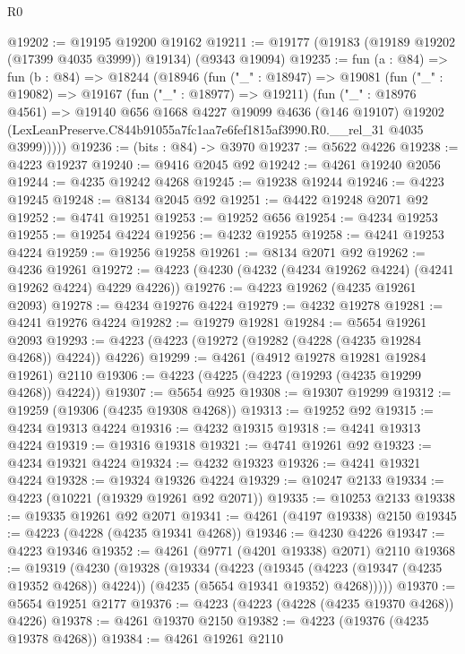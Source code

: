 \begin{lexlean}{R0}
\begin{coremodule}
@19202 := @19195 @19200 @19162
@19211 := @19177 (@19183 (@19189 @19202 (@17399 @4035 @3999)) @19134) (@9343 @19094)
@19235 := fun (a : @84) =>
  fun (b : @84) =>
  @18244
    (@18946
      (fun ("_" : @18947) =>
      @19081
        (fun ("_" : @19082) =>
        @19167
          (fun ("_" : @18977) => @19211)
          (fun ("_" : @18976 @4561) =>
          @19140
            @656
            @1668
            @4227
            @19099
            @4636
            (@146 @19107)
            @19202
            (LexLeanPreserve.C844b91055a7fc1aa7e6fef1815af3990.R0.__rel_31 @4035 @3999)))))
@19236 := (bits : @84) -> @3970
@19237 := @5622 @4226
@19238 := @4223 @19237
@19240 := @9416 @2045 @92
@19242 := @4261 @19240 @2056
@19244 := @4235 @19242 @4268
@19245 := @19238 @19244
@19246 := @4223 @19245
@19248 := @8134 @2045 @92
@19251 := @4422 @19248 @2071 @92
@19252 := @4741 @19251
@19253 := @19252 @656
@19254 := @4234 @19253
@19255 := @19254 @4224
@19256 := @4232 @19255
@19258 := @4241 @19253 @4224
@19259 := @19256 @19258
@19261 := @8134 @2071 @92
@19262 := @4236 @19261
@19272 := @4223 (@4230 (@4232 (@4234 @19262 @4224) (@4241 @19262 @4224) @4229 @4226))
@19276 := @4223 @19262 (@4235 @19261 @2093)
@19278 := @4234 @19276 @4224
@19279 := @4232 @19278
@19281 := @4241 @19276 @4224
@19282 := @19279 @19281
@19284 := @5654 @19261 @2093
@19293 := @4223 (@4223 (@19272 (@19282 (@4228 (@4235 @19284 @4268)) @4224)) @4226)
@19299 := @4261 (@4912 @19278 @19281 @19284 @19261) @2110
@19306 := @4223 (@4225 (@4223 (@19293 (@4235 @19299 @4268)) @4224))
@19307 := @5654 @925
@19308 := @19307 @19299
@19312 := @19259 (@19306 (@4235 @19308 @4268))
@19313 := @19252 @92
@19315 := @4234 @19313 @4224
@19316 := @4232 @19315
@19318 := @4241 @19313 @4224
@19319 := @19316 @19318
@19321 := @4741 @19261 @92
@19323 := @4234 @19321 @4224
@19324 := @4232 @19323
@19326 := @4241 @19321 @4224
@19328 := @19324 @19326 @4224
@19329 := @10247 @2133
@19334 := @4223 (@10221 (@19329 @19261 @92 @2071))
@19335 := @10253 @2133
@19338 := @19335 @19261 @92 @2071
@19341 := @4261 (@4197 @19338) @2150
@19345 := @4223 (@4228 (@4235 @19341 @4268))
@19346 := @4230 @4226
@19347 := @4223 @19346
@19352 := @4261 (@9771 (@4201 @19338) @2071) @2110
@19368 := @19319
    (@4230
      (@19328
        (@19334
          (@4223
            (@19345 (@4223 (@19347 (@4235 @19352 @4268)) @4224))
            (@4235 (@5654 @19341 @19352) @4268)))))
@19370 := @5654 @19251 @2177
@19376 := @4223 (@4223 (@4228 (@4235 @19370 @4268)) @4226)
@19378 := @4261 @19370 @2150
@19382 := @4223 (@19376 (@4235 @19378 @4268))
@19384 := @4261 @19261 @2110

\end{coremodule}
\end{lexlean}
